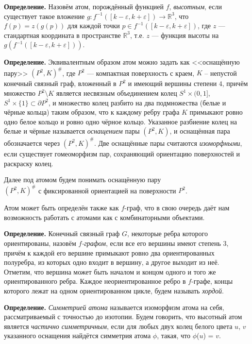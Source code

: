 \textbf{Определение. }
	Назовём атом, порождённый функцией $f$, {\em высотным}, если существует такое вложение $g
	\colon f^{-1}([k-\varepsilon, k+\varepsilon ]) \to \mathbb{R}^3$, что $f(p) = z(g(p))$ для каждой точки $p \in f^{-1}([k-\varepsilon, k+\varepsilon ])$, где $z$
	--- стандартная координата в пространстве $\mathbb R^3$, т.е. $z$ --- функция высоты на $g(f^{-1}([k-\varepsilon, k+\varepsilon ]))$.




\textbf{Определение.} Эквивалентным образом атом можно задать как <<оснащённую пару>> $(P^2, K)^\#$, где $P^2$ --- компактная   поверхность с краем, $K$ -- непустой конечный связный граф, вложенный в $P^2$ и имеющий вершины  степени $4$, причём множество $P^2 \setminus K$ является несвязным объединением колец $S^1 \times (0, 1]$, $ S^1 \times \{1\} \subset\partial P^2$, и множество колец разбито на два подмножества (белые и чёрные кольца) таким образом, что  к каждому ребру графа $K$ примыкают ровно одно белое кольцо и ровно одно чёрное кольцо. Указанное разбиение колец на белые и чёрные называется {\em  оснащением} пары $(P^2, K)$, и оснащённая пара обозначается через $(P^2, K)^\#$. Две оснащённые пары считаются {\em изоморфными}, если существует гомеоморфизм пар, сохраняющий ориентацию поверхностей и раскраску колец.


Далее под атомом будем понимать оснащённую пару
\\$(P^2, K)^\#$ с фиксированной ориентацией на поверхности $P^2$.



Атом может быть определён также как $f$-граф, что в свою очередь даёт нам возможность работать с атомами как с комбинаторными объектами.



\textbf{Определение.} %
Конечный связный граф $G$, некоторые ребра которого ориентированы, назовём {\em
$f$-графом}, если все его вершины имеют степень $3$, причём к каждой его
вершине примыкают ровно два ориентированных полуребра, из которых одно входит в вершину,
а другое выходит из неё. Отметим, что вершина может быть началом и концом одного и того
же ориентированного ребра. Каждое неориентированное ребро в $f$-графе, концы которого лежат на одном ориентированном цикле, будем называть { \em хордой}.



{\bf Определение.}
	{\em Симметрией атома} называется изоморфизм атома на себя, рассматриваемый с точностью до изотопии. Будем говорить, что высотный атом является {\em частично симметричным}, если для любых двух колец белого цвета $u$, $v$ указанного оснащения найдётся симметрия атома $\phi $, такая, что $\phi$($u$) = $v$.



